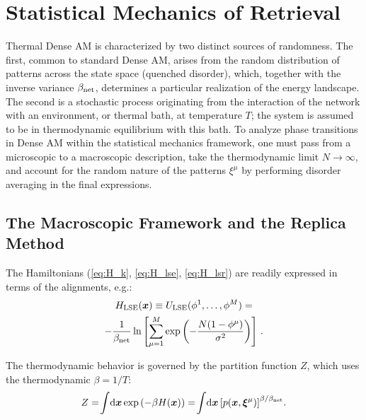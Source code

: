 \documentclass{article}
\newcommand{\dd}{{\mathrm{d}}}
\theoremstyle{plain}
\theoremstyle{definition}
\theoremstyle{remark}
\begin{document}
\section{Statistical Mechanics of Retrieval}

Thermal Dense AM is characterized by two distinct sources of randomness. The first, common to standard Dense AM, arises from the random distribution of patterns across the state space (quenched disorder), which, together with the inverse variance $\beta_{\rm net}$, determines a particular realization of the energy landscape. The second is a stochastic process originating from the interaction of the network with an environment, or thermal bath, at temperature $T$; the system is assumed to be in thermodynamic equilibrium with this bath. To analyze phase transitions in Dense AM within the statistical mechanics framework, one must pass from a microscopic to a macroscopic description, take the thermodynamic limit $N \to \infty$, and account for the random nature of the patterns $\xi^\mu$ by performing disorder averaging in the final expressions.

\subsection{The Macroscopic Framework and the Replica Method}

The Hamiltonians (\ref{eq:H_k}, \ref{eq:H_lse}, \ref{eq:H_lsr}) are readily expressed in terms of the alignments, e.g.:
\begin{multline}
    H_{\rm LSE}(\bm{x}) \equiv U_{\rm LSE}(\phi^1, \dots, \phi^M) = \\ -\frac{1}{\beta_{\rm net}} \ln \left[ \sum_{\mu=1}^M \exp\left( -\frac{N(1 - \phi^\mu)}{\sigma^2} \right) \right]\,.
\end{multline}

The thermodynamic behavior is governed by the partition function $Z$, which uses the thermodynamic $\beta = 1/T$:
\begin{equation}
    Z = \!\int\!\dd \bm{x} \exp\left( -\beta H(\bm{x}) \right) = \!\int\! \dd \bm{x} \left[ p(\bm{x}, \bm{\xi}^\mu) \right]^{\beta/\beta_{\rm net}}\!.
    \label{eq:partition}
\end{equation}
\end{document}
